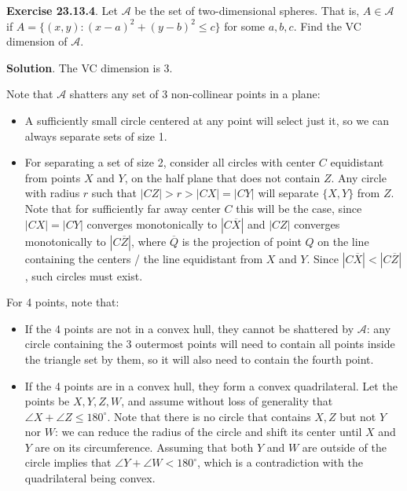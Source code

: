 \textbf{Exercise 23.13.4}. Let \(\mathcal{A}\) be the set of
two-dimensional spheres. That is, \(A \in \mathcal{A}\) if
\(A = \{ (x, y) : (x - a)^{2} + (y - b)^{2} \leq c \}\) for some
\(a, b, c\). Find the VC dimension of \(\mathcal{A}\).

\textbf{Solution}. The VC dimension is 3.

Note that \(\mathcal{A}\) shatters any set of 3 non-collinear points in
a plane:

\begin{itemize}[tightlist]
\item
  A sufficiently small circle centered at any point will select just it,
  so we can always separate sets of size 1.
\item
  For separating a set of size 2, consider all circles with center \(C\)
  equidistant from points \(X\) and \(Y\), on the half plane that does
  not contain \(Z\). Any circle with radius \(r\) such that
  \(|CZ| > r > |CX| = |CY|\) will separate \(\{ X, Y \}\) from \(Z\).
  Note that for sufficiently far away center \(C\) this will be the
  case, since \(|CX| = |CY|\) converges monotonically to
  \(|C\overline{X}|\) and \(|CZ|\) converges monotonically to
  \(|C\overline{Z}|\), where \(\overline{Q}\) is the projection of point
  \(Q\) on the line containing the centers / the line equidistant from
  \(X\) and \(Y\). Since \(|C\overline{X}| < |C\overline{Z}|\), such
  circles must exist.
\end{itemize}

For 4 points, note that:

\begin{itemize}[tightlist]
\item
  If the 4 points are not in a convex hull, they cannot be shattered by
  \(\mathcal{A}\): any circle containing the 3 outermost points will
  need to contain all points inside the triangle set by them, so it will
  also need to contain the fourth point.
\item
  If the 4 points are in a convex hull, they form a convex
  quadrilateral. Let the points be \(X, Y, Z, W\), and assume without
  loss of generality that \(\angle X + \angle Z \leq 180^\circ\). Note
  that there is no circle that contains \(X, Z\) but not \(Y\) nor
  \(W\): we can reduce the radius of the circle and shift its center
  until \(X\) and \(Y\) are on its circumference. Assuming that both
  \(Y\) and \(W\) are outside of the circle implies that
  \(\angle Y + \angle W < 180^\circ\), which is a contradiction with the
  quadrilateral being convex.
\end{itemize}

